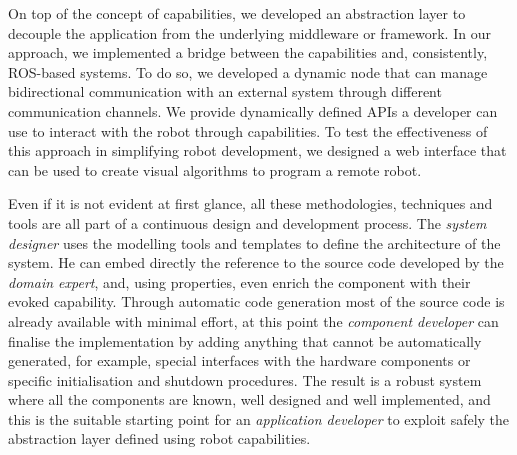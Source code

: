 On top of the concept of capabilities, we developed an abstraction layer to decouple the application from the underlying middleware or framework. In our approach, we implemented a bridge between the capabilities and, consistently, ROS-based systems. To do so, we developed a dynamic node that can manage bidirectional communication with an external system through different communication channels. We provide dynamically defined APIs a developer can use to interact with the robot through capabilities. To test the effectiveness of this approach in simplifying robot development, we designed a web interface that can be used to create visual algorithms to program a remote robot.

Even if it is not evident at first glance, all these methodologies, techniques and tools are all part of a continuous design and development process. The \textit{system designer} uses the modelling tools and templates to define the architecture of the system. He can embed directly the reference to the source code developed by the \textit{domain expert}, and, using properties, even enrich the component with their evoked capability. Through automatic code generation most of the source code is already available with minimal effort, at this point the \textit{component developer} can finalise the implementation by adding anything that cannot be automatically generated, for example, special interfaces with the hardware components or specific initialisation and shutdown procedures. The result is a robust system where all the components are known, well designed and well implemented, and this is the suitable starting point for an \textit{application developer} to exploit safely the abstraction layer defined using robot capabilities.

